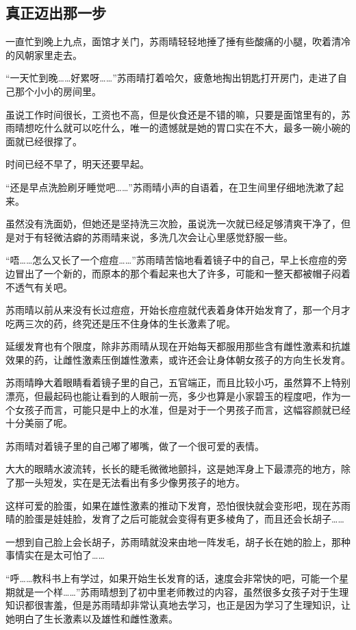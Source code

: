 \subsection{真正迈出那一步}

一直忙到晚上九点，面馆才关门，苏雨晴轻轻地捶了捶有些酸痛的小腿，吹着清冷的风朝家里走去。

“一天忙到晚……好累呀……”苏雨晴打着哈欠，疲惫地掏出钥匙打开房门，走进了自己那个小小的房间里。

虽说工作时间很长，工资也不高，但是伙食还是不错的嘛，只要是面馆里有的，苏雨晴想吃什么就可以吃什么，唯一的遗憾就是她的胃口实在不大，最多一碗小碗的面就已经很撑了。

时间已经不早了，明天还要早起。

“还是早点洗脸刷牙睡觉吧……”苏雨晴小声的自语着，在卫生间里仔细地洗漱了起来。

虽然没有洗面奶，但她还是坚持洗三次脸，虽说洗一次就已经足够清爽干净了，但是对于有轻微洁癖的苏雨晴来说，多洗几次会让心里感觉舒服一些。

“唔……怎么又长了一个痘痘……”苏雨晴苦恼地看着镜子中的自己，早上长痘痘的旁边冒出了一个新的，而原本的那个看起来也大了许多，可能和一整天都被帽子闷着不透气有关吧。

苏雨晴以前从来没有长过痘痘，开始长痘痘就代表着身体开始发育了，那一个月才吃两三次的药，终究还是压不住身体的生长激素了呢。

延缓发育也有个限度，除非苏雨晴从现在开始每天都服用那些含有雌性激素和抗雄效果的药，让雌性激素压倒雄性激素，或许还会让身体朝女孩子的方向生长发育。

苏雨晴睁大着眼睛看着镜子里的自己，五官端正，而且比较小巧，虽然算不上特别漂亮，但最起码也能让看到的人眼前一亮，多少也算是小家碧玉的程度吧，作为一个女孩子而言，可能只是中上的水准，但是对于一个男孩子而言，这幅容颜就已经十分美丽了呢。

苏雨晴对着镜子里的自己嘟了嘟嘴，做了一个很可爱的表情。

大大的眼睛水波流转，长长的睫毛微微地颤抖，这是她浑身上下最漂亮的地方，除了那一头短发，实在是无法看出有多少像男孩子的地方。

这样可爱的脸蛋，如果在雄性激素的推动下发育，恐怕很快就会变形吧，现在苏雨晴的脸蛋是娃娃脸，发育了之后可能就会变得有更多棱角了，而且还会长胡子……

一想到自己脸上会长胡子，苏雨晴就没来由地一阵发毛，胡子长在她的脸上，那种事情实在是太可怕了……

“呼……教科书上有学过，如果开始生长发育的话，速度会非常快的吧，可能一个星期就是一个样……”苏雨晴想到了初中里老师教过的内容，虽然很多女孩子对于生理知识都很害羞，但是苏雨晴却非常认真地去学习，也正是因为学习了生理知识，让她明白了生长激素以及雄性和雌性激素。

